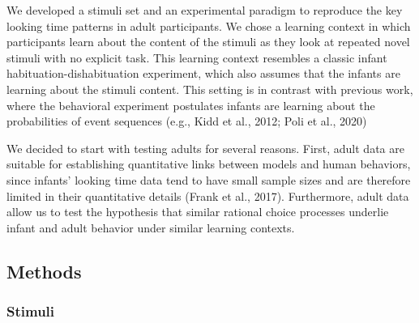 \documentclass[10pt, letterpaper]{article}
\begin{document}
We developed a stimuli set and an experimental paradigm to reproduce the
key looking time patterns in adult participants. We chose a learning
context in which participants learn about the content of the stimuli as
they look at repeated novel stimuli with no explicit task. This learning
context resembles a classic infant habituation-dishabituation
experiment, which also assumes that the infants are learning about the
stimuli content. This setting is in contrast with previous work, where
the behavioral experiment postulates infants are learning about the
probabilities of event sequences (e.g., Kidd et al., 2012; Poli et al.,
2020)

We decided to start with testing adults for several reasons. First,
adult data are suitable for establishing quantitative links between
models and human behaviors, since infants' looking time data tend to
have small sample sizes and are therefore limited in their quantitative
details (Frank et al., 2017). Furthermore, adult data allow us to test
the hypothesis that similar rational choice processes underlie infant
and adult behavior under similar learning contexts.

\hypertarget{methods}{%
\subsection{Methods}\label{methods}}

\hypertarget{stimuli}{%
\subsubsection{Stimuli}\label{stimuli}}
\end{document}
